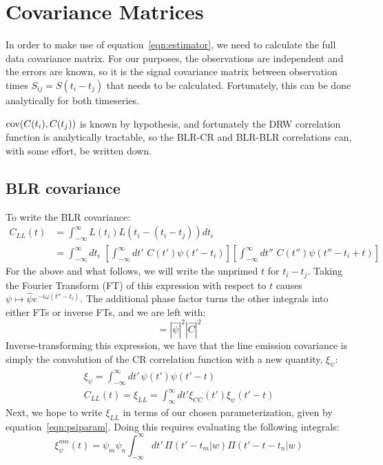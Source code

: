 \documentclass[11pt,a4paper]{article}
\begin{document}
\section{Covariance Matrices}
In order to make use of equation~\ref{eqn:estimator}, we need to calculate the
full data covariance matrix. For our purposes, the observations
are independent and the errors are known, so it is the signal
covariance matrix between observation times $S_{ij}=S(t_i-t_j)$  that
needs to be calculated. Fortunately, this can be done analytically for
both timeseries. 

${\rm cov}(C(t_i),C(t_j))$ is known by hypothesis, and fortunately the
DRW correlation function is analytically tractable, so the BLR-CR and
BLR-BLR correlations can, with some effort, be written down.


\subsection{BLR covariance}
To write the BLR covariance:
\begin{align}
C_{LL}(t) & = \int_{-\infty}^{\infty}L(t_i)L(t_i-(t_i-t_j)) dt_i \\
& = \int_{-\infty}^{\infty}dt_i\,\,\left[\int_{-\infty}^{\infty}dt'\,\,C(t')\psi(t'-t_i)\right]\left[\int_{-\infty}^{\infty}dt''\,\,C(t'')\psi(t''-t_i+t)\right]
\end{align}
For the above and what follows, we will write the unprimed $t$ for
$t_i-t_j$.  Taking the Fourier Transform (FT) of this expression with
respect to $t$ causes $\psi \mapsto \hat{\psi}e^{-i\omega
  \left(t''-t_i\right)}$. The additional phase factor turns the other
integrals into either FTs or inverse FTs, and we are left with:
\begin{equation}
  = |\hat{\psi}|^2|\hat{C}|^2
\end{equation}
Inverse-transforming this expression, we have that the line emission
covariance is simply the convolution of the CR correlation function
with a new quantity, $\xi_{\psi}$:
\begin{align}
  \xi_{\psi} = \int_{-\infty}^{\infty}dt'\,\psi(t')\psi(t'-t) \\
  C_{LL}(t)= \xi_{LL} = \int_{\infty}^{\infty}dt' \xi_{CC}(t')\xi_{\psi}(t'-t)
\end{align}
Next, we hope to write $\xi_{LL}$ in terms of our chosen parameterization, given
by equation~\ref{eqn:psiparam}. Doing this requires evaluating the
following integrals: 
\begin{equation}
\xi_{\psi}^{mn}(t)=
\psi_m\psi_n\int_{-\infty}^{\infty}dt'\,\Pi(t'-t_m|w)\Pi(t'-t-t_n|w)
  \label{eqn:xipsi}
\end{equation}
\end{document}
